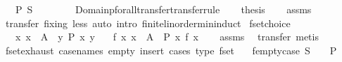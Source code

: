 \begin{isabellebody}
\ \ \ {\isachardoublequoteopen}P\ S{\isachardoublequoteclose}\isanewline
%
\isadelimproof
%
\endisadelimproof
%
\isatagproof
{}\isamarkupfalse%
\ {\isacharminus}\isanewline
\ \ \isanewline
\ \ \isamarkupfalse%
\ Domainp{\isacharunderscore}forall{\isacharunderscore}transfer{\isacharbrackleft}transfer{\isacharunderscore}rule{\isacharbrackright}\isanewline
\ \ \isamarkupfalse%
\ {\isacharquery}thesis\isanewline
\ \ \isamarkupfalse%
\ assms\ \isamarkupfalse%
\ {\isacharparenleft}transfer\ fixing{\isacharcolon}\ less{\isacharparenright}\ {\isacharparenleft}auto\ intro{\isacharcolon}\ finite{\isacharunderscore}linorder{\isacharunderscore}min{\isacharunderscore}induct{\isacharparenright}\isanewline
{}\isamarkupfalse%
%
\endisatagproof
{\isafoldproof}%
%
\isadelimproof
\isanewline
%
\endisadelimproof
\isanewline
{}\isamarkupfalse%
%
\isadelimdocument
%
\endisadelimdocument
%
\isatagdocument
%
\isamarkuptrue%
%
\endisatagdocument
{\isafolddocument}%
%
\isadelimdocument
%
\endisadelimdocument
{}\isamarkupfalse%
\ fset{\isacharunderscore}choice{\isacharcolon}\isanewline
\ \ \ {\isachardoublequoteopen}{\isasymforall}x{\isachardot}\ x\ {\isacharbar}{\isasymin}{\isacharbar}\ A\ {\isasymlongrightarrow}\ {\isacharparenleft}{\isasymexists}y{\isachardot}\ P\ x\ y{\isacharparenright}{\isachardoublequoteclose}\isanewline
\ \ \ {\isachardoublequoteopen}{\isasymexists}f{\isachardot}\ {\isasymforall}x{\isachardot}\ x\ {\isacharbar}{\isasymin}{\isacharbar}\ A\ {\isasymlongrightarrow}\ P\ x\ {\isacharparenleft}f\ x{\isacharparenright}{\isachardoublequoteclose}\isanewline
%
\isadelimproof
\ \ %
\endisadelimproof
%
\isatagproof
{}\isamarkupfalse%
\ assms\ \isamarkupfalse%
\ transfer\ metis%
\endisatagproof
{\isafoldproof}%
%
\isadelimproof
%
\endisadelimproof
%
\isadelimdocument
%
\endisadelimdocument
%
\isatagdocument
%
\isamarkuptrue%
%
\endisatagdocument
{\isafolddocument}%
%
\isadelimdocument
%
\endisadelimdocument
{}\isamarkupfalse%
\ fset{\isacharunderscore}exhaust\ {\isacharbrackleft}case{\isacharunderscore}names\ empty\ insert{\isacharcomma}\ cases\ type{\isacharcolon}\ fset{\isacharbrackright}{\isacharcolon}\isanewline
\ \ \ fempty{\isacharunderscore}case{\isacharcolon}\ {\isachardoublequoteopen}S\ {\isacharequal}\ {\isacharbraceleft}{\isacharbar}{\isacharbar}{\isacharbraceright}\ {\isasymLongrightarrow}\ P{\isachardoublequoteclose}\isanewline

\end{isabellebody}
